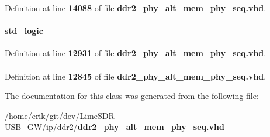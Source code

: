 Definition at line {\bf 14088} of file {\bf ddr2\+\_\+phy\+\_\+alt\+\_\+mem\+\_\+phy\+\_\+seq.\+vhd}.

\paragraph[{trefi\+\_\+failure}]{ {\bfseries \textcolor{comment}{std\+\_\+logic}\textcolor{vhdlchar}{ }} \hspace{0.3cm}{\ttfamily [Signal]}}\label{classddr2__phy__alt__mem__phy__seq_1_1struct_acf780bd95f5ae4466aa3d694d4b4ea60}


Definition at line {\bf 12931} of file {\bf ddr2\+\_\+phy\+\_\+alt\+\_\+mem\+\_\+phy\+\_\+seq.\+vhd}.

\paragraph[{work}]{\hspace{0.3cm}{\ttfamily [Library]}}\label{classddr2__phy__alt__mem__phy__seq_1_1struct_a9f49de6f5eed5b4488cba6c9cdd1c215}


Definition at line {\bf 12845} of file {\bf ddr2\+\_\+phy\+\_\+alt\+\_\+mem\+\_\+phy\+\_\+seq.\+vhd}.



The documentation for this class was generated from the following file\+:\begin{DoxyCompactItemize}
\item 
/home/erik/git/dev/\+Lime\+S\+D\+R-\/\+U\+S\+B\+\_\+\+G\+W/ip/ddr2/{\bf ddr2\+\_\+phy\+\_\+alt\+\_\+mem\+\_\+phy\+\_\+seq.\+vhd}\end{DoxyCompactItemize}
